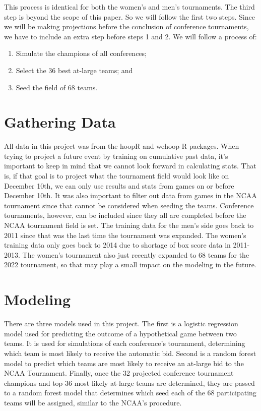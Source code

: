 \documentclass{article}
\begin{document}
This process is identical for both the women's \cite{ncaa_wbb_procedures} and men's \cite{ncaa_mbb_procedures} tournaments. The third step is beyond the scope of this paper. So we will follow the first two steps. Since we will be making projections before the conclusion of conference tournaments, we have to include an extra step before steps 1 and 2. We will follow a process of:

\begin{enumerate}
	\item Simulate the champions of all conferences;
	\item Select the 36 best at-large teams; and
	\item Seed the field of 68 teams.
\end{enumerate}

\section{Gathering Data}

All data in this project was from the hoopR \cite{gilani_2021_hoopR} and wehoop \cite{hutchinson_gilani_2021_wehoop} R packages. When trying to project a future event by training on cumulative past data, it's important to keep in mind that we cannot look forward in calculating stats. That is, if that goal is to project what the tournament field would look like on December 10th, we can only use results and stats from games on or before December 10th. It was also important to filter out data from games in the NCAA tournament since that cannot be considered when seeding the teams. Conference tournaments, however, can be included since they all are completed before the NCAA tournament field is set. The training data for the men's side goes back to 2011 since that was the last time the tournament was expanded. The women's training data only goes back to 2014 due to shortage of box score data in 2011-2013. The women's tournament also just recently expanded to 68 teams for the 2022 tournament, so that may play a small impact on the modeling in the future.

\section{Modeling}

There are three models used in this project. The first is a logistic regression model used for predicting the outcome of a hypothetical game between two teams. It is used for simulations of each conference's tournament, determining which team is most likely to receive the automatic bid. Second is a random forest model to predict which teams are most likely to receive an at-large bid to the NCAA Tournament. Finally, once the 32 projected conference tournament champions and top 36 most likely at-large teams are determined, they are passed to a random forest model that determines which seed each of the 68 participating teams will be assigned, similar to the NCAA's procedure.
\end{document}
